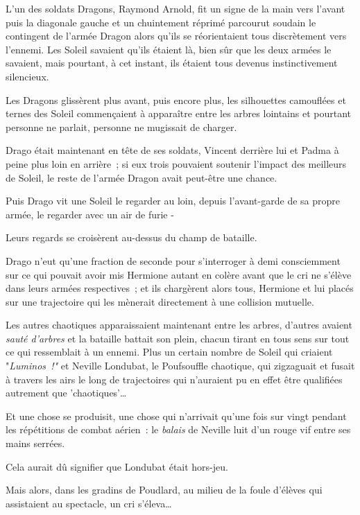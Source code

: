 \later

L'un des soldats Dragons, Raymond Arnold, fit un signe de la main vers l'avant puis la diagonale gauche et un chuintement réprimé parcourut soudain le contingent de l'armée Dragon alors qu'ils se réorientaient tous discrètement vers l'ennemi. Les Soleil savaient qu'ils étaient là, bien sûr que les deux armées le savaient, mais pourtant, à cet instant, ils étaient tous devenus instinctivement silencieux.

Les Dragons glissèrent plus avant, puis encore plus, les silhouettes camouflées et ternes des Soleil commençaient à apparaître entre les arbres lointains et pourtant personne ne parlait, personne ne mugissait de charger.

Drago était maintenant en tête de ses soldats, Vincent derrière lui et Padma à peine plus loin en arrière~; si eux trois pouvaient soutenir l'impact des meilleurs de Soleil, le reste de l'armée Dragon avait peut-être une chance.

Puis Drago vit une Soleil le regarder au loin, depuis l'avant-garde de sa propre armée, le regarder avec un air de furie -

Leurs regards se croisèrent au-dessus du champ de bataille.

Drago n'eut qu'une fraction de seconde pour s'interroger à demi consciemment sur ce qui pouvait avoir mis Hermione autant en colère avant que le cri ne s'élève dans leurs armées respectives~; et ils chargèrent alors tous, Hermione et lui placés sur une trajectoire qui les mènerait directement à une collision mutuelle.

\later

Les autres chaotiques apparaissaient maintenant entre les arbres, d'autres avaient \emph{sauté d'arbres} et la bataille battait son plein, chacun tirant en tous sens sur tout ce qui ressemblait à un ennemi. Plus un certain nombre de Soleil qui criaient "\emph{Luminos~!"} et Neville Londubat, le Poufsouffle chaotique, qui zigzaguait et fusait à travers les airs le long de trajectoires qui n'auraient pu en effet être qualifiées autrement que 'chaotiques'…

Et une chose se produisit, une chose qui n'arrivait qu'une fois sur vingt pendant les répétitions de combat aérien~: le \emph{balais} de Neville luit d'un rouge vif entre ses mains serrées.

Cela aurait dû signifier que Londubat était hors-jeu.

Mais alors, dans les gradins de Poudlard, au milieu de la foule d'élèves qui assistaient au spectacle, un cri s'éleva…

